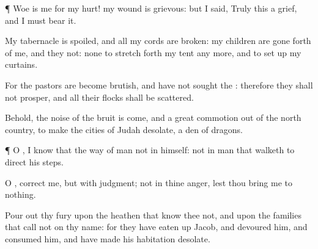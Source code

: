 {\par }{\PP {}¶
Woe is me for my
hurt! my
wound is
grievous: but I
said,
Truly this
{} a
grief, and I must
bear it.

My
tabernacle is
spoiled, and all my
cords are
broken: my
children are gone
forth of me, and they
{} not:
{} none to stretch
forth my
tent any more, and to set
up my
curtains.

For the
pastors are become
brutish, and have not
sought the
{}: therefore they shall not
prosper, and all their
flocks shall be
scattered.

Behold, the
noise of the
bruit is
come, and a
great
commotion out of the
north
country, to
make the
cities of
Judah
desolate,
{} a
den of
dragons.


\par }{\PP {}¶ O
{}, I
know that the
way of
man
{} not in himself:
{} not in
man that
walketh to
direct his
steps.

O
{},
correct me, but with
judgment; not in thine
anger, lest thou bring me to
nothing.

Pour
out thy
fury upon the
heathen that
know thee not, and upon the
families that
call not on thy
name: for they have eaten
up
Jacob, and
devoured him, and
consumed him, and have made his
habitation
desolate.




\par }

